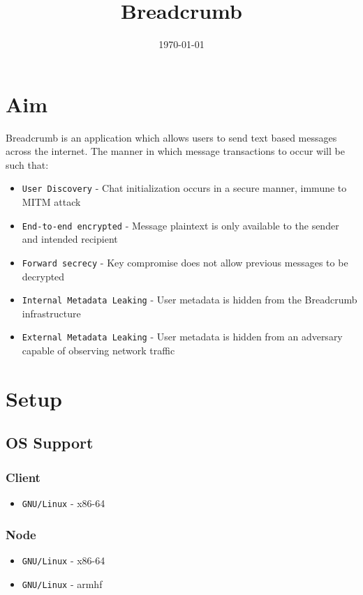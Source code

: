 \documentclass{article}
\begin{document}
\title{Breadcrumb}
\date{\today}  %
\maketitle

\newpage
\tableofcontents
\newpage

\section{Aim}
Breadcrumb is an application which allows users to send text based messages across the internet.
The manner in which message transactions to occur will be such that:
\begin{itemize}
	\item \texttt{User Discovery} - Chat initialization occurs in a secure manner, immune to MITM attack
	\item \texttt{End-to-end encrypted} - Message plaintext is only available to the sender and intended recipient
	\item \texttt{Forward secrecy} - Key compromise does not allow previous messages to be decrypted
	\item \texttt{Internal Metadata Leaking} - User metadata is hidden from the Breadcrumb infrastructure
	\item \texttt{External Metadata Leaking} - User metadata is hidden from an adversary capable of observing network traffic
\end{itemize}

\section{Setup}
\subsection{OS Support}
\subsubsection{Client}
\begin{itemize}
	\item \texttt{GNU/Linux} - x86-64
\end{itemize}
\subsubsection{Node}
\begin{itemize}
	\item \texttt{GNU/Linux} - x86-64
	\item \texttt{GNU/Linux} - armhf
\end{itemize}
\end{document}
